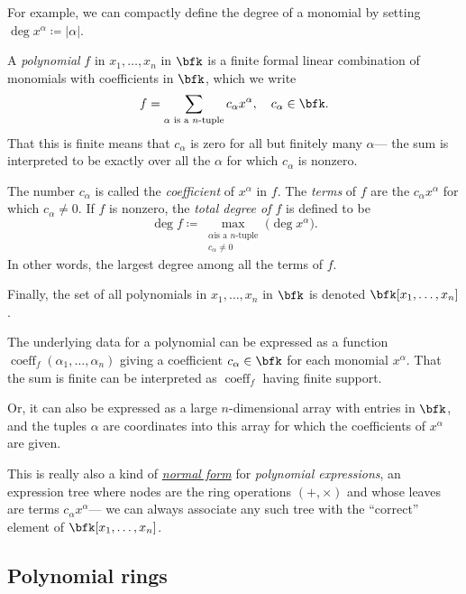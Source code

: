 \documentclass{article}
\DeclareMathOperator{\degree}{deg}
\DeclareMathOperator{\coeff}{coeff}
\begin{document}
For example, we can compactly define the degree of a monomial by setting $\degree x^\alpha \coloneq |\alpha|$.

\begin{definition}
    A \textit{polynomial} $f$ in $x_1,\ldots,x_n$ in $\bfk$ is a finite formal linear combination of monomials with coefficients in $\bfk$, which we write
    \[
        f = \sum_{\alpha \text{ is a }n\text{-tuple}}c_\alpha x^\alpha, \quad c_\alpha \in \bfk.
    \]
    That this is finite means that $c_\alpha$ is zero for all but finitely many $\alpha$--- the sum is interpreted to be exactly over all the $\alpha$ for which $c_\alpha$ is nonzero.

    The number $c_\alpha$ is called the \textit{coefficient} of $x^\alpha$ in $f$.
    The \textit{terms} of $f$ are the $c_\alpha x^\alpha$ for which $c_\alpha \neq 0$.
    If $f$ is nonzero, the \textit{total degree of $f$} is defined to be
    \[
        \degree f \coloneq \max_{\substack{\alpha \text{is a }n\text{-tuple} \\ c_\alpha \neq 0}} \Big(\deg x^\alpha \Big).
    \]
    In other words, the largest degree among all the terms of $f$.

    Finally, the set of all polynomials in $x_1,\ldots,x_n$ in $\bfk$ is denoted $\bfk[x_1,\ldots,x_n]$.
\end{definition}

The underlying data for a polynomial can be expressed as a function $\coeff_f(\alpha_1, \ldots, \alpha_n)$ giving a coefficient $c_\alpha \in \bfk$ for each monomial $x^\alpha$.
That the sum is finite can be interpreted as $\coeff_f$ having finite support.

Or, it can also be expressed as a large $n$-dimensional array with entries in $\bfk$, and the tuples $\alpha$ are coordinates into this array for which the coefficients of $x^\alpha$ are given.

This is really also a kind of \href{https://en.wikipedia.org/wiki/Normal_form_(abstract_rewriting)}{\textit{normal form}} for \textit{polynomial expressions}, an expression tree where nodes are the ring operations $(+,\times)$ and whose leaves are terms $c_\alpha x^\alpha$--- we can always associate any such tree with the ``correct'' element of $\bfk[x_1,\ldots,x_n]$.

\subsection{Polynomial rings}
\end{document}
